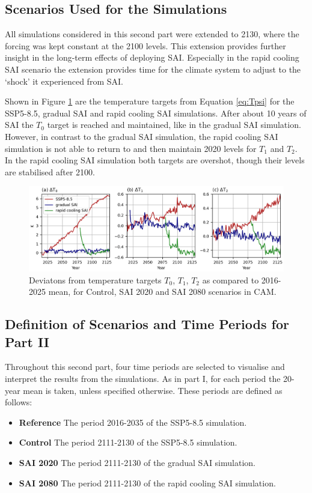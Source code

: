 \subsection{Scenarios Used for the Simulations}
All simulations considered in this second part were extended to 2130, where the forcing was kept constant at the 2100 levels. This extension provides further insight in the long-term effects of deploying SAI. Especially in the rapid cooling SAI scenario the extension provides time for the climate system to adjust to the `shock' it experienced from SAI. 

Shown in Figure \ref{fig:Tgrad_ext} are the temperature targets from Equation \ref{eq:Tpsi} for the SSP5-8.5, gradual SAI and rapid cooling SAI simulations. After about 10 years of SAI the $T_0$ target is reached and maintained, like in the gradual SAI simulation. However, in contrast to the gradual SAI simulation, the rapid cooling SAI simulation is not able to return to and then maintain 2020 levels for $T_1$ and $T_2$. In the rapid cooling SAI simulation both targets are overshot, though their levels are stabilised after 2100. 

\begin{figure}[h]
	\centering
	\includegraphics[width=\linewidth]{images/Tgrad_ext.png}
	\caption{Deviatons from temperature targets $T_0$, $T_1$, $T_2$ as compared to 2016-2025 mean, for Control, SAI 2020 and SAI 2080 scenarios in CAM.}
	\label{fig:Tgrad_ext}
\end{figure}


\subsection{Definition of Scenarios and Time Periods for Part II}
Throughout this second part, four time periods are selected to visualise and interpret the results from the simulations. As in part I, for each period the 20-year mean is taken, unless specified otherwise. These periods are defined as follows:

\begin{itemize}
    \item \textbf{Reference} The period 2016-2035 of the SSP5-8.5 simulation.
    \item \textbf{Control} The period 2111-2130 of the SSP5-8.5 simulation.
    \item \textbf{SAI 2020} The period 2111-2130 of the gradual SAI simulation.
    \item \textbf{SAI 2080} The period 2111-2130 of the rapid cooling SAI simulation.
\end{itemize} %


